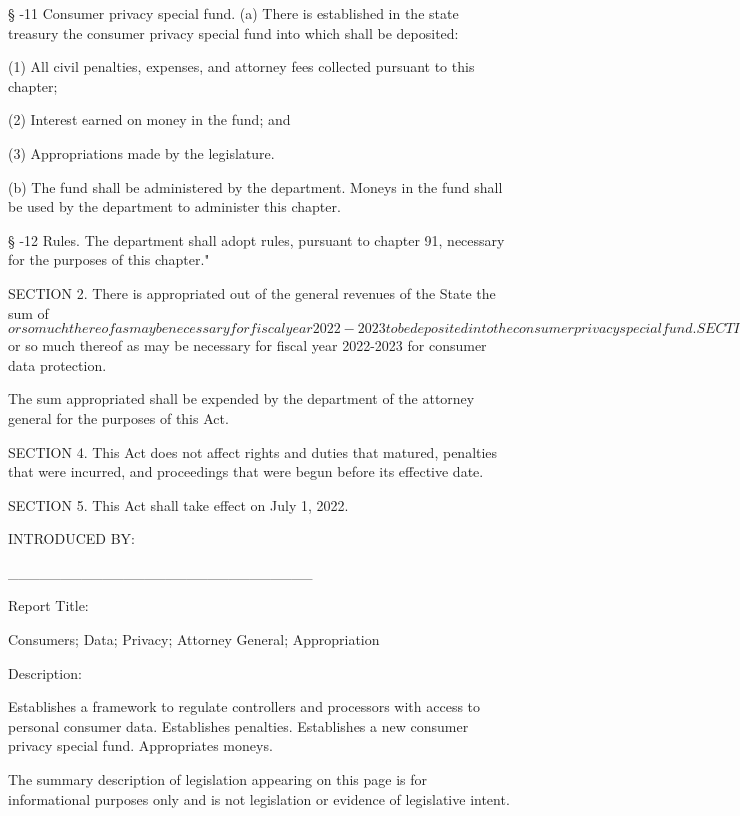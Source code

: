      §   -11  Consumer privacy special fund.  (a) There is established in the state treasury the consumer privacy special fund into which shall be deposited:

     (1)  All civil penalties, expenses, and attorney fees collected pursuant to this chapter;

     (2)  Interest earned on money in the fund; and

     (3)  Appropriations made by the legislature.

     (b)  The fund shall be administered by the department.  Moneys in the fund shall be used by the department to administer this chapter.

     §   -12  Rules.  The department shall adopt rules, pursuant to chapter 91, necessary for the purposes of this chapter."

     SECTION 2.  There is appropriated out of the general revenues of the State the sum of $           or so much thereof as may be necessary for fiscal year 2022-2023 to be deposited into the consumer privacy special fund.

     SECTION 3.  There is appropriated out of the consumer privacy special fund the sum of $           or so much thereof as may be necessary for fiscal year 2022-2023 for consumer data protection.

     The sum appropriated shall be expended by the department of the attorney general for the purposes of this Act.

     SECTION 4.  This Act does not affect rights and duties that matured, penalties that were incurred, and proceedings that were begun before its effective date.

     SECTION 5.  This Act shall take effect on July 1, 2022.

 

INTRODUCED BY:

_____________________________

 

 

 


 

Report Title:

Consumers; Data; Privacy; Attorney General; Appropriation

 

Description:

Establishes a framework to regulate controllers and processors with access to personal consumer data.  Establishes penalties.  Establishes a new consumer privacy special fund.  Appropriates moneys.

 

 

 

The summary description of legislation appearing on this page is for informational purposes only and is not legislation or evidence of legislative intent.